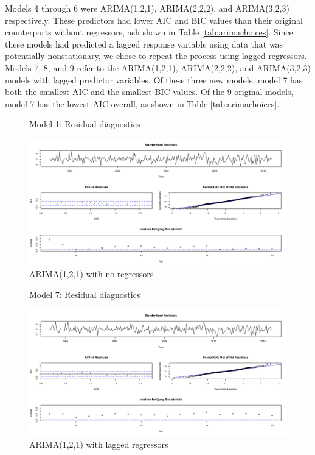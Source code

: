 \documentclass[twoside,twocolumn]{article}
\begin{document}
Models 4 through 6 were ARIMA(1,2,1), ARIMA(2,2,2), and ARIMA(3,2,3) respectively.  These predictors had lower AIC and BIC values than their original counterparts without regressors, ash shown in Table \ref{tab:arimachoices}. Since these models had predicted a lagged response variable using data that was potentially nonstationary, we chose to repeat the process using lagged regressors.  Models 7, 8, and 9 refer to the ARIMA(1,2,1), ARIMA(2,2,2), and ARIMA(3,2,3) models with lagged predictor variables.  Of these three new models, model 7 has both the smallest AIC and the smallest BIC values. Of the 9 original models, model 7 has the lowest AIC overall, as shown in Table \ref{tab:arimachoices}.  


		    \begin{figure}[htb]
    	\centering
    	\caption{Model 1: Residual diagnostics}
     	\includegraphics[width=\linewidth]{images/sarima1}
     	\caption*{ARIMA(1,2,1) with no regressors}
     	\label{fig:sarimamod1}
     \end{figure}


    \begin{figure}[htb]
    	\centering
    	\caption{Model 7: Residual diagnostics}
     	\includegraphics[width=\linewidth]{images/sarima7}
     	\caption*{ARIMA(1,2,1) with lagged regressors}
     	\label{fig:sarimamod7}
     \end{figure}
     
\end{document}

